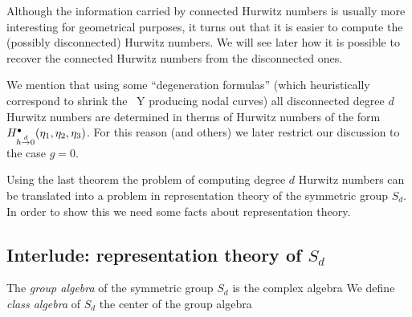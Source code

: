 \documentclass[10pt,handout]{beamer} %
\begin{document}
\begin{frame}

Although the information carried by connected Hurwitz numbers is usually more interesting for geometrical purposes, it turns out that it is easier to compute the (possibly disconnected) Hurwitz numbers. We will see later how it is possible to recover the connected Hurwitz numbers from the disconnected ones. \pause

\vspace{\baselineskip}

We mention that using some ``degeneration formulas'' (which heuristically correspond to shrink the \rs\ Y producing nodal curves) all disconnected degree $d$ Hurwitz numbers are determined in therms of Hurwitz numbers of the form $H^\bullet_{h\overset d\to0}(\eta_1,\eta_2,\eta_3)$. For this reason (and others) we later restrict our discussion to the case $g=0$. \pause

\vspace{\baselineskip}

Using the last theorem the problem of computing degree $d$ Hurwitz numbers can be translated into a problem in representation theory of the symmetric group $S_d$. In order to show this we need some facts about representation theory. 

\end{frame}

\subsection{Interlude: representation theory of $S_d$}

\begin{frame}

\begin{definition}
	The \emph{group algebra} of the symmetric group $S_d$ is the complex algebra
	We define \emph{class algebra} of $S_d$ the center of the group algebra
\end{definition}

\pause


\end{frame}
\end{document}
